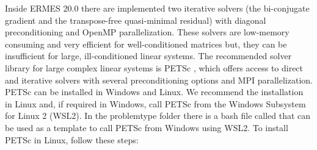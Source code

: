 Inside ERMES 20.0 there are implemented two iterative solvers (the bi-conjugate gradient and the transpose-free quasi-minimal residual) with diagonal preconditioning and OpenMP parallelization. These solvers are low-memory consuming and very efficient for well-conditioned matrices but, they can be insufficient for large, ill-conditioned linear systems. The recommended solver library for large complex linear systems is PETSc \cite{PETScWeb}, which offers access to direct and iterative solvers with several preconditioning options and MPI parallelization. PETSc can be installed in Windows and Linux. We recommend the installation in Linux and, if required in Windows, call PETSc from the Windows Subsystem for Linux 2 (WSL2). In the problemtype folder  there is a bash file called  that can be used as a template to call PETSc from Windows using WSL2. To install PETSc in Linux, follow these steps:
